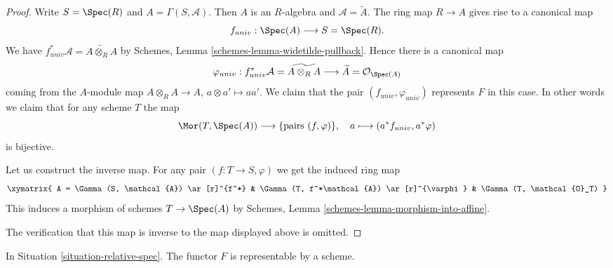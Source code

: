 \begin{proof}
Write $S = \Spec(R)$ and $A = \Gamma(S, \mathcal{A})$.
Then $A$ is an $R$-algebra and $\mathcal{A} = \widetilde A$.
The ring map $R \to A$ gives rise to a canonical map
$$
f_{univ} : \Spec(A)
\longrightarrow
S = \Spec(R).
$$
We have
$f_{univ}^*\mathcal{A} =  \widetilde{A \otimes_R A}$
by Schemes, Lemma \ref{schemes-lemma-widetilde-pullback}.
Hence there is a canonical map
$$
\varphi_{univ} :
f_{univ}^*\mathcal{A} = \widetilde{A \otimes_R A}
\longrightarrow
\widetilde A = \mathcal{O}_{\Spec(A)}
$$
coming from the $A$-module map $A \otimes_R A \to A$,
$a \otimes a' \mapsto aa'$. We claim that the pair
$(f_{univ}, \varphi_{univ})$ represents $F$ in this case.
In other words we claim that for any scheme $T$ the map
$$
\Mor(T, \Spec(A)) \longrightarrow \{\text{pairs } (f, \varphi)\},\quad
a \longmapsto (a^*f_{univ}, a^*\varphi)
$$
is bijective.

\medskip\noindent
Let us construct the inverse map.
For any pair $(f : T \to S, \varphi)$ we get the induced
ring map
$$
\xymatrix{
A = \Gamma(S, \mathcal{A}) \ar[r]^{f^*} &
\Gamma(T, f^*\mathcal{A}) \ar[r]^{\varphi} &
\Gamma(T, \mathcal{O}_T)
}
$$
This induces a morphism of schemes $T \to \Spec(A)$
by Schemes, Lemma \ref{schemes-lemma-morphism-into-affine}.

\medskip\noindent
The verification that this map is inverse to the map
displayed above is omitted.
\end{proof}

\begin{lemma}
\label{lemma-spec}
In Situation \ref{situation-relative-spec}.
The functor $F$ is representable by a scheme.
\end{lemma}

